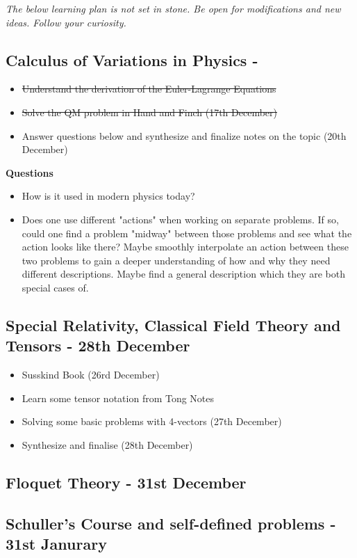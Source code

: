 \textit{The below learning plan is not set in stone. Be open for modifications and new ideas. Follow your curiosity.}
\subsection*{Calculus of Variations in Physics - }   
\begin{itemize}
    \item \sout{Understand the derivation of the Euler-Lagrange Equations}
    \item \sout{Solve the QM problem in Hand and Finch (17th December)}
    \item Answer questions below and synthesize and finalize notes on the topic (20th December)
\end{itemize}
\textbf{Questions}
\begin{itemize}
    \item How is it used in modern physics today?
    \item Does one use different "actions" when working on separate problems. If so, could one find a problem "midway" between those problems and see what the action looks like there? Maybe smoothly interpolate an action between these two problems to gain a deeper understanding of how and why they need different descriptions. Maybe find a general description which they are both special cases of. 
\end{itemize} 
\subsection*{Special Relativity, Classical Field Theory and Tensors - 28th December}
\begin{itemize}
    \item Susskind Book (26rd December)
    \item Learn some tensor notation from Tong Notes
    \item Solving some basic problems with 4-vectors (27th December)
    \item Synthesize and finalise (28th December)
\end{itemize}
\subsection*{Floquet Theory - 31st December}
\subsection*{Schuller's Course and self-defined problems - 31st Janurary}
